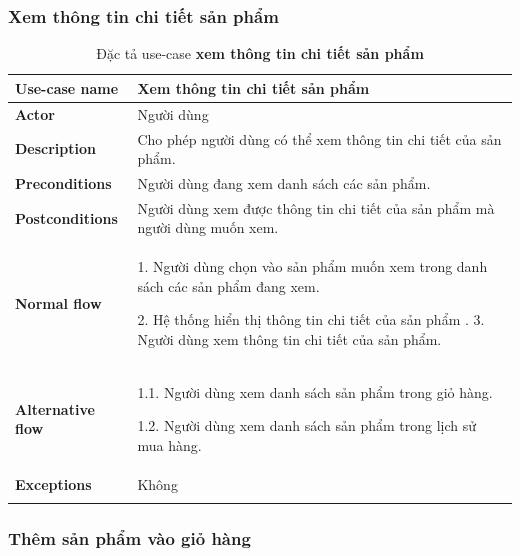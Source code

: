             \subsubsection{Xem thông tin chi tiết sản phẩm } 
         \begin{longtable}{| p{} | p{} |} 
    \hline
    \textbf{Use-case name} 
    & 
    Xem thông tin chi tiết sản phẩm
    \\
    \hline
    \textbf{Actor} 
    & 
    Người dùng
    \\
    \hline
    \textbf{Description} 
    & 
    Cho phép người dùng có thể xem thông tin chi tiết của sản phẩm.
    \\
    \hline
    \textbf{Preconditions} 
    &
    Người dùng đang xem danh sách các sản phẩm.
    \\
    \hline
    \textbf{Postconditions} 
    & 
    Người dùng xem được thông tin chi tiết của sản phẩm mà người dùng muốn xem.
    \\
    \hline
    \begin{flushleft}
    \textbf{Normal flow}
    \end{flushleft}
    & 
        1. Người dùng chọn vào sản phẩm muốn xem trong danh sách các sản phẩm đang xem.
        
        2. Hệ thống hiển thị thông tin chi tiết của sản phẩm
        .
        3. Người dùng xem thông tin chi tiết của sản phẩm.
    \\
    \hline
    \textbf{Alternative flow}
    & 
    1.1. Người dùng xem danh sách sản phẩm trong giỏ hàng.
    
    1.2. Người dùng xem danh sách sản phẩm trong lịch sử mua hàng.
    \\
    \hline
    \textbf{Exceptions} 
    &
    Không
    \\
    \hline
    \caption{Đặc tả use-case \textbf{xem thông tin chi tiết sản phẩm}}
    \end{longtable}


    \subsubsection{ Thêm sản phẩm vào giỏ hàng}    
            

